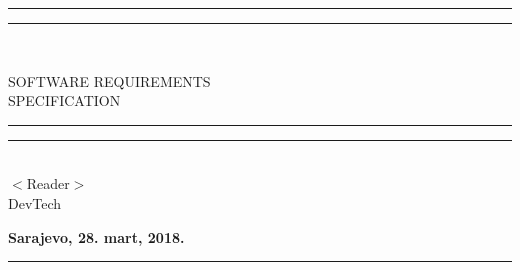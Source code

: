 \documentclass{scrreprt}
\date{}
\begin{document}
\begin{titlepage}
\begin{flushright}
    \rule[0.5ex]{\linewidth}{2pt}\vspace*{-\baselineskip}\vspace*{3.2pt}
    \rule[0.5ex]{\linewidth}{1pt}\\[\baselineskip]
    \begin{bfseries}
        \Huge{SOFTWARE REQUIREMENTS\\ SPECIFICATION}\\
            \rule[0.5ex]{\linewidth}{2pt}\vspace*{-\baselineskip}\vspace*{3.2pt}
    \rule[0.5ex]{\linewidth}{1pt}\\[\baselineskip]
        \vspace{1.9cm}
        \vspace{1.9cm}
        $<$Reader$>$\\
        \vspace{3cm}
        \vspace{1.9cm}
        DevTech
        \vspace{4cm}
    \end{bfseries}
\end{flushright}


\begin{center}
    \Large\textbf{Sarajevo, 28. mart, 2018.} 
    \rule[0.5ex]{\linewidth}{2pt}\vspace*{-\baselineskip}\vspace*{3.2pt}
\end{center}

\end{titlepage}

\tableofcontents







\end{document}
